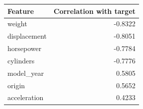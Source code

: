 \begin{tabular}{lr}
\toprule
Feature & Correlation with target \\
\midrule
weight & -0.8322 \\
displacement & -0.8051 \\
horsepower & -0.7784 \\
cylinders & -0.7776 \\
model\_year & 0.5805 \\
origin & 0.5652 \\
acceleration & 0.4233 \\
\bottomrule
\end{tabular}